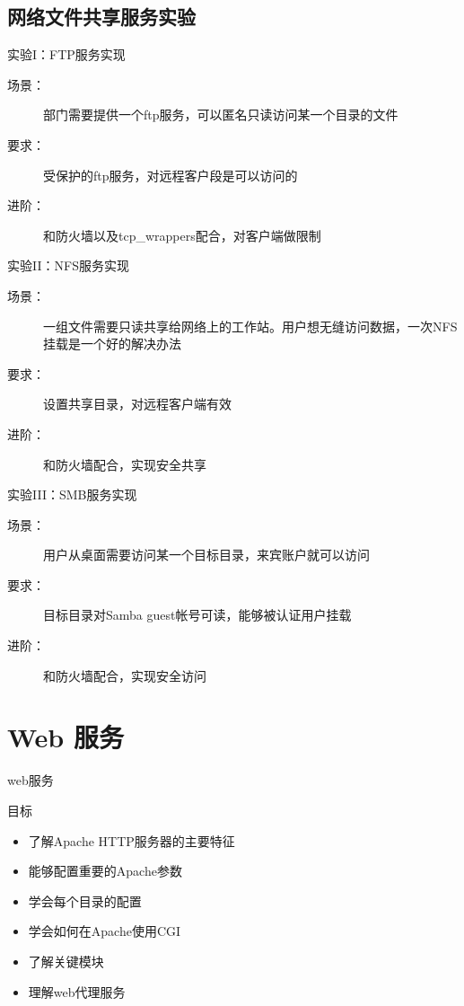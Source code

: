 \subsection{网络文件共享服务实验}


\begin{frame}{实验I：FTP服务实现}
\begin{description}
\item [{场景：}] 部门需要提供一个ftp服务，可以匿名只读访问某一个目录的文件
\item [{要求：}] 受保护的ftp服务，对远程客户段是可以访问的
\item [{进阶：}] 和防火墙以及tcp\_wrappers配合，对客户端做限制
\end{description}

\end{frame} 
\begin{frame}{实验II：NFS服务实现}
\begin{description}
\item [{场景：}] 一组文件需要只读共享给网络上的工作站。用户想无缝访问数据，一次NFS挂载是一个好的解决办法
\item [{要求：}] 设置共享目录，对远程客户端有效
\item [{进阶：}] 和防火墙配合，实现安全共享
\end{description}

\end{frame} 
\begin{frame}{实验III：SMB服务实现}
\begin{description}
\item [{场景：}] 用户从桌面需要访问某一个目标目录，来宾账户就可以访问
\item [{要求：}] 目标目录对Samba guest帐号可读，能够被认证用户挂载
\item [{进阶：}] 和防火墙配合，实现安全访问
\end{description}

\end{frame} 
\section{Web 服务}


\begin{frame}{web服务}

目标
\begin{itemize}
\item 了解Apache HTTP服务器的主要特征
\item 能够配置重要的Apache参数
\item 学会每个目录的配置
\item 学会如何在Apache使用CGI
\item 了解关键模块
\item 理解web代理服务
\end{itemize}

\end{frame} 

